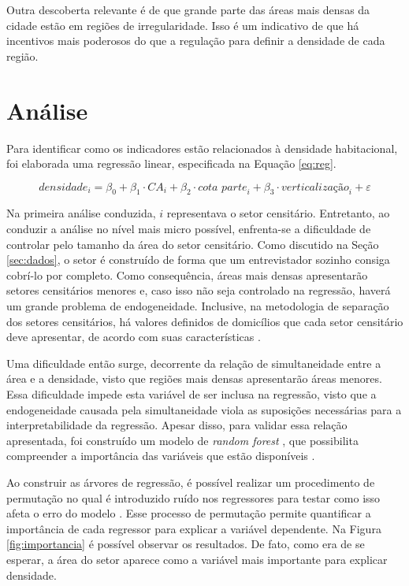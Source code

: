 Outra descoberta relevante é de que grande parte das áreas mais densas da cidade estão em regiões de irregularidade. Isso é um indicativo de que há incentivos mais poderosos do que a regulação para definir a densidade de cada região.



\chapter{Análise}

Para identificar como os indicadores estão relacionados à densidade habitacional, foi elaborada uma regressão linear, especificada na Equação \ref{eq:reg}. 

\begin{equation}
    \textit{densidade}_i = \beta_0 + \beta_1 \cdot \textit{CA}_i + \beta_2 \cdot\textit{cota parte}_i + \beta_3\cdot\textit{verticalização}_i + \varepsilon
    \label{eq:reg}
\end{equation}

Na primeira análise conduzida, $i$ representava o setor censitário. Entretanto, ao conduzir a análise no nível mais micro possível, enfrenta-se a dificuldade de controlar pelo tamanho da área do setor censitário. Como discutido na Seção \ref{sec:dados}, o setor é construído de forma que um entrevistador sozinho consiga cobrí-lo por completo. Como consequência, áreas mais densas apresentarão setores censitários menores e, caso isso não seja controlado na regressão, haverá um grande problema de endogeneidade. Inclusive, na metodologia de separação dos setores censitários, há valores definidos de domicílios que cada setor censitário deve apresentar, de acordo com suas características \cite{IBGE2024}.

Uma dificuldade então surge, decorrente da relação de simultaneidade entre a área e a densidade, visto que regiões mais densas apresentarão áreas menores. Essa dificuldade impede esta variável de ser inclusa na regressão, visto que a endogeneidade causada pela simultaneidade viola as suposições necessárias para a interpretabilidade da regressão. Apesar disso, para validar essa relação apresentada, foi construído um modelo de \textit{random forest} , que possibilita compreender a importância das variáveis que estão disponíveis \cite{wright2015ranger}.

Ao construir as árvores de regressão, é possível realizar um procedimento de permutação no qual é introduzido ruído nos regressores para testar como isso afeta o erro do modelo \cite{breiman2001random, Nembrini2018}. Esse processo de permutação permite quantificar a importância de cada regressor para explicar a variável dependente. Na Figura \ref{fig:importancia} é possível observar os resultados. De fato, como era de se esperar, a área do setor aparece como a variável mais importante para explicar densidade.

